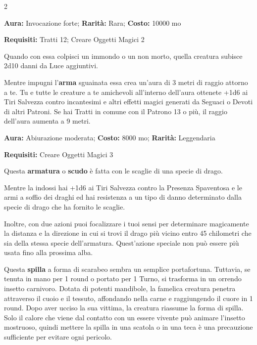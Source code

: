 \begin{multicols}{2}

\textbf{Aura:} Invocazione forte; \textbf{Rarità:} Rara; \textbf{Costo:} 10000 mo

\textbf{Requisiti:} Tratti  12; Creare Oggetti Magici 2

Quando con essa colpisci un immondo o un non morto, quella creatura subisce 2d10 danni da Luce aggiuntivi.

Mentre impugni l'\textbf{arma} sguainata essa crea un'aura di 3 metri di raggio attorno a te. Tu e tutte le creature a te amichevoli all'interno dell'aura ottenete +1d6 ai Tiri Salvezza contro incantesimi e altri effetti magici generati da Seguaci o Devoti di altri Patroni. Se hai Tratti in comune con il Patrono 13 o più, il raggio dell'aura aumenta a 9 metri.


\textbf{Aura:} Abiurazione moderata; \textbf{Costo:} 8000 mo; \textbf{Rarità:} Leggendaria

\textbf{Requisiti:} Creare Oggetti Magici 3

Questa \textbf{armatura} o \textbf{scudo} è fatta con le scaglie di una specie di drago.

Mentre la indossi hai +1d6 ai Tiri Salvezza contro la Presenza Spaventosa e le armi a soffio dei draghi ed hai resistenza a un tipo di danno determinato dalla specie di drago che ha fornito le scaglie.

Inoltre, con due azioni puoi focalizzare i tuoi sensi per determinare magicamente la distanza e la direzione in cui si trovi il drago più vicino entro 45 chilometri che sia della stessa specie dell'armatura. Quest'azione speciale non può essere più usata fino alla prossima alba.


Questa \textbf{spilla} a forma di scarabeo sembra un semplice portafortuna. Tuttavia, se tenuta in mano per 1 round o portato per 1 Turno, si trasforma in un orrendo insetto carnivoro. Dotata di potenti mandibole, la famelica creatura penetra attraverso il cuoio e il tessuto, affondando nella carne e raggiungendo il cuore in 1 round. Dopo aver ucciso la sua vittima, la creatura riassume la forma di spilla. Solo il calore che viene dal contatto con un essere vivente può animare l'insetto mostruoso, quindi mettere la spilla in una scatola o in una teca è una precauzione sufficiente per evitare ogni pericolo.



\end{multicols}

